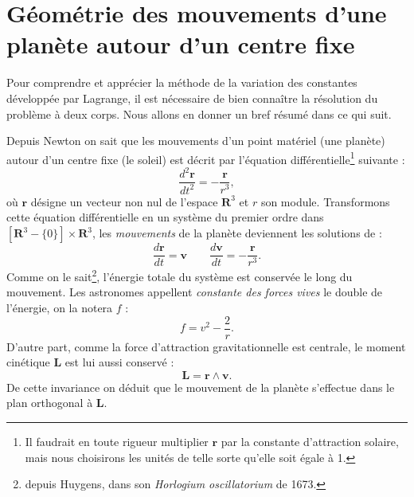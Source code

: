 \documentclass[12pt,paperletter, reqno]{amsart}
\newcommand{\rr}{\mathbf{r}}
\newcommand{\vv}{\mathbf{v}}
\newcommand{\LL}{\mathbf{L}}
\newcommand{\RR}{\mathbf{R}}
\theoremstyle{plain}
\theoremstyle{remark}
\begin{document}
  \section{Géométrie des mouvements d'une planète autour d'un centre fixe}
  
  Pour comprendre et apprécier la méthode de la variation des constantes développée par Lagrange,
  il est nécessaire de bien connaître la résolution du problème à deux corps.
  Nous allons en donner un bref résumé dans ce qui suit.
  
  
  Depuis Newton on sait que les mouvements d'un point matériel (une planète) autour d'un centre fixe (le soleil) est décrit par l'équation différentielle\footnote{Il faudrait en toute rigueur multiplier $\rr$ par la constante d'attraction solaire, mais nous choisirons les unités de telle sorte qu'elle soit égale à 1.} suivante :
  \begin{equation}
    \frac{d^2\rr}{dt^2} = - \frac{\rr}{r^3},
  \end{equation}
  où $\rr$ désigne un vecteur non nul de l'espace $\RR^3$ et $r$ son module.
  Transformons cette équation différentielle en un système du premier ordre dans $[\RR^3-\{0\}]\times \RR^3$,
  les \emph{mouvements} de la planète deviennent les solutions de :
  \begin{equation}
    \frac{d\rr}{dt}= \vv \qquad \frac{d\vv}{dt}= - \frac{\rr}{r^3}.
  \end{equation}
  Comme on le sait\footnote{depuis Huygens, dans son \emph{Horlogium oscillatorium} de 1673.},
  l'énergie totale du système est conservée le long du mouvement.
  Les astronomes appellent \emph{constante des forces vives} le double de l'énergie,
  on la notera $f$ :
  \begin{equation}
    f = {v^2} - \frac{2}{r}.
  \end{equation}
  D'autre part,
  comme la force d'attraction gravitationnelle est centrale,
  le moment cinétique $\LL$ est lui aussi conservé :
  \begin{equation}
    \LL=\rr\wedge \vv.
  \end{equation}
  De cette invariance on déduit que le mouvement de la planète s'effectue dans le plan orthogonal à $\LL$.
  
\end{document}
